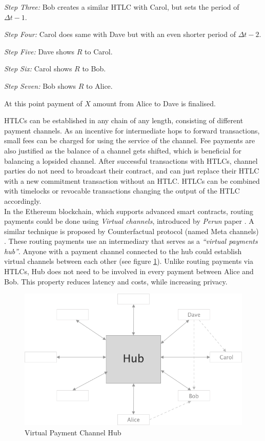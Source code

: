 \documentclass[a4paper,12pt]{article}
\begin{document}
\textit{Step Three:}
Bob creates a similar HTLC with Carol, but sets the period of $\Delta t - 1$.

\textit{Step Four:}
Carol does same with Dave but with an even shorter period of $\Delta t - 2$.

\textit{Step Five:}
Dave shows $R$ to Carol.

\textit{Step Six:}
Carol shows $R$ to Bob.

\textit{Step Seven:}
Bob shows $R$ to Alice.

At this point payment of $X$ amount from Alice to Dave is finalised. 

HTLCs can be established in any chain of any length, consisting of different 
payment channels. As an incentive for intermediate hops to forward transactions,
small fees can be charged for using the service of the channel. Fee payments are 
also justified as the balance of a channel gets shifted, which is beneficial for 
balancing a lopsided channel. After successful transactions with HTLCs, channel 
parties do not need to broadcast their contract, and can just replace their HTLC 
with a new commitment transaction without an HTLC. HTLCs can be combined with 
timelocks or revocable transactions changing the output of the HTLC accordingly.\\ 

In the Ethereum blockchain, which supports advanced smart contracts, routing 
payments could be done using \textit{Virtual channels}, introduced by \textit{Perun}
paper \cite{perun}. A similar technique is proposed by Counterfactual protocol 
(named Meta channels) \cite{counterfactual}. These routing payments use an 
intermediary that serves as a \textit{“virtual payments hub”}. Anyone with a 
payment channel connected to the hub could establish virtual channels between each
other (see figure \ref{img:hub}). Unlike routing payments via HTLCs, Hub does not 
need to be involved in every payment between Alice and Bob. This property reduces 
latency and costs, while increasing privacy.

\begin{figure}[H]
    \centering
    \includegraphics[scale=0.5]{../img/hub}
    \caption{Virtual Payment Channel Hub}
    \label{img:hub}
\end{figure}
\end{document}
